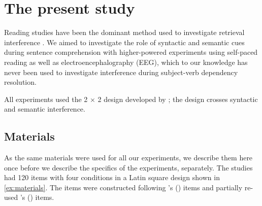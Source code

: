 \documentclass[a4paper, man, floatsintext]{apa7}
\begin{document}
\section{The present study}

Reading studies have been the dominant method used to investigate retrieval interference \parencite[see the review in][]{jaeger_etal_2017}.  We aimed to investigate the role of syntactic and semantic cues during sentence comprehension with higher-powered experiments using  self-paced reading as well as electroencephalography (EEG), which to our knowledge has never been used to investigate interference during subject-verb dependency resolution.

All experiments used the 2 $\times$ 2 design developed by \textcite{vandyke07}; the design crosses syntactic and semantic interference. 

\subsection{Materials}

As the same materials were used for all our experiments, we describe them here once before we describe the specifics of the experiments, separately. The studies had 120 items with four conditions in a Latin square design shown in \ref{ex:materials}. The items were constructed following \citeauthor{vandyke07}'s (\citeyear{vandyke07}) items and partially re-used  \citeauthor{mertzen}'s (\citeyear{mertzen}) items.
\end{document}
